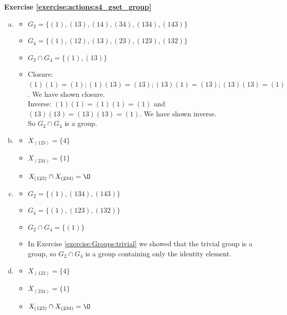 \noindent\textbf{Exercise \ref{exercise:actions:s4_gset_group}}
\begin{enumerate}[(a)]
\item
	\begin{itemize}
	\item
	$G_2 = \{(1), (13), (14), (34), (134), (143)\}$
	
	\item
	$G_4 = \{(1), (12), (13), (23), (123), (132)\}$
	
	\item
	$G_2 \cap G_4 = \{(1), (13)\}$
	
	\item
	Closure: $(1)(1) = (1); (1)(13) = (13); (13)(1) = (13); (13)(13) = (1)$. We have shown closure.
	\\
	Inverse: $(1)(1) = (1)(1) = (1)$ and $(13)(13) = (13)(13) = (1)$. We have shown inverse.
	\\
	So $G_2 \cap G_4$ is a group.
	\end{itemize}
	
\item
	\begin{itemize}
	\item
	$X_{(123)} = \{4\}$
	
	\item
	$X_{(234)} = \{1\}$
	
	\item
	$X_{(123)} \cap X_{(234)} = \O$
	\end{itemize}
	
\item
	\begin{itemize}
	\item
	$G_2 = \{(1), (134), (143)\}$
	
	\item
	$G_4 = \{(1), (123), (132)\}$
	
	\item
	$G_2 \cap G_4 = \{(1)\}$
	
	\item
	In Exercise \ref{exercise:Groups:trivial} we showed that the trivial group is a group, so $G_2 \cap G_4$ is a group containing only the identity element.
	\end{itemize}
	
\item
	\begin{itemize}
	\item
	$X_{(123)} = \{4\}$
	
	\item
	$X_{(234)} = \{1\}$
	
	\item
	$X_{(123)} \cap X_{(234)} = \O$
	\end{itemize}
\end{enumerate}

